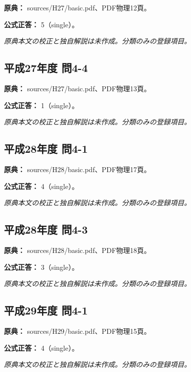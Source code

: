 \noindent\textbf{原典：} sources/H27/basic.pdf、PDF物理12頁。

\textbf{公式正答：} 5（single）。

\par\textit{原典本文の校正と独自解説は未作成。分類のみの登録項目。}

\subsection{平成27年度 問4-4}
\label{q:h27-reg-basic-4-4}

\noindent\textbf{原典：} sources/H27/basic.pdf、PDF物理13頁。

\textbf{公式正答：} 1（single）。

\par\textit{原典本文の校正と独自解説は未作成。分類のみの登録項目。}

\subsection{平成28年度 問4-1}
\label{q:h28-reg-basic-4-1}

\noindent\textbf{原典：} sources/H28/basic.pdf、PDF物理17頁。

\textbf{公式正答：} 4（single）。

\par\textit{原典本文の校正と独自解説は未作成。分類のみの登録項目。}

\subsection{平成28年度 問4-3}
\label{q:h28-reg-basic-4-3}

\noindent\textbf{原典：} sources/H28/basic.pdf、PDF物理18頁。

\textbf{公式正答：} 3（single）。

\par\textit{原典本文の校正と独自解説は未作成。分類のみの登録項目。}

\subsection{平成29年度 問4-1}
\label{q:h29-reg-basic-4-1}

\noindent\textbf{原典：} sources/H29/basic.pdf、PDF物理15頁。

\textbf{公式正答：} 4（single）。

\par\textit{原典本文の校正と独自解説は未作成。分類のみの登録項目。}

